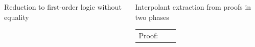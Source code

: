 \documentclass[final,hyperref={pdfpagelabels=true}]{beamer}
\newcommand{\itemizeOnBlockStart}{
		\vspace*{-0.5em}
	}
\begin{document}
\begin{frame}
\begin{columns}[t]
\begin{column}{\mycolwidth}
\begin{block}{Reduction to first-order logic without equality \cite{Craig57linear}}
			\end{block}

		\end{column}
		\begin{column}{\mycolwidth}


					\newcommand{\proofwidth}{0.2\textwidth}
					\newcommand{\proofindent}{\hspace*{10.21em}}

					\newcommand{\stagearrow}{{\Large$\Downarrow$}}

			\begin{block}{Interpolant extraction from proofs in two phases \cite{Huang95}}



					\newcommand{\fakemulticolwidth}{0.28\textwidth}
					\begin{tabular}{p{}ll}

					Proof: 
					&


\end{tabular}
\end{block}
\end{column}
\end{columns}
\end{frame}
\end{document}
